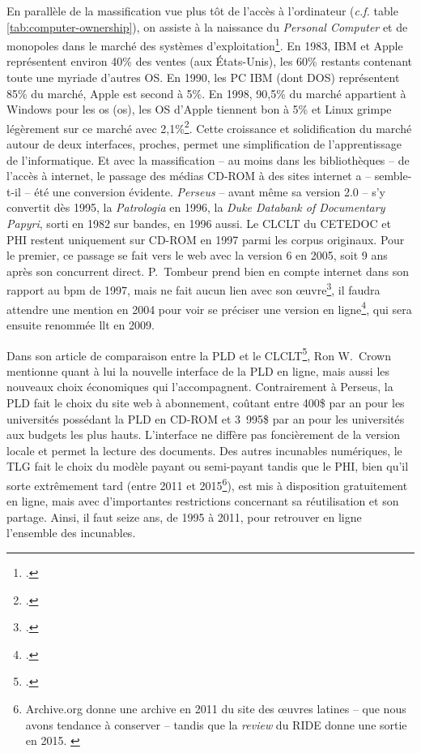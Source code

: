 En parallèle de la massification vue plus tôt de l'accès à l'ordinateur (\textit{c.f.} table \ref{tab:computer-ownership}), on assiste à la naissance du \textit{Personal Computer} et de monopoles dans le marché des systèmes d'exploitation\footcite{schlender_whos_1990}. En 1983, IBM et Apple représentent environ 40\% des ventes (aux États-Unis), les 60\% restants contenant toute une myriade d'autres OS. En 1990, les PC IBM (dont DOS) représentent 85\% du marché, Apple est second à 5\%. En 1998, 90,5\% du marché appartient à Windows pour les \acrfull{os} (\acrshort{os}), les OS d'Apple tiennent bon à 5\% et Linux grimpe légèrement sur ce marché avec 2,1\%\footcite{miles_windows_1999, reimer_total_2005}. Cette croissance et solidification du marché autour de deux interfaces, proches, permet une simplification de l'apprentissage de l'informatique. Et avec la massification -- au moins dans les bibliothèques -- de l'accès à internet, le passage des médias CD-ROM à des sites internet a -- semble-t-il -- été une conversion évidente. \textit{Perseus} -- avant même sa version 2.0 -- s'y convertit dès 1995, la \textit{Patrologia} en 1996, la \textit{Duke Databank of Documentary Papyri}, sorti en 1982 sur bandes, en 1996 aussi. Le CLCLT du CETEDOC  et PHI restent uniquement sur CD-ROM en 1997 parmi les corpus originaux. Pour le premier, ce passage se fait vers le web avec la version 6 en 2005, soit 9 ans après son concurrent direct. P.~Tombeur prend bien en compte internet dans son rapport au \acrfull{bpm} de 1997, mais ne fait aucun lien avec son œuvre\footcite{tombeur_informatique_1997}, il faudra attendre une mention en 2004 pour voir se préciser une version en ligne\footcite{tombeur_augustin_2004}, qui sera ensuite renommée \acrfull{llt} en 2009.

Dans son article de comparaison entre la PLD et le CLCLT\footcite{crown_comparing_2000}, Ron W.~Crown mentionne quant à lui la nouvelle interface de la PLD en ligne, mais aussi les nouveaux choix économiques qui l'accompagnent. Contrairement à Perseus, la PLD fait le choix du site web à abonnement, coûtant entre 400\$ par an pour les universités possédant la PLD en CD-ROM et 3~995\$ par an pour les universités aux budgets les plus hauts. L'interface ne diffère pas foncièrement de la version locale et permet la lecture des documents. Des autres incunables numériques, le TLG fait le choix du modèle payant ou semi-payant tandis que le PHI, bien qu'il sorte extrêmement tard (entre 2011 et 2015\footnote{Archive.org donne une archive en 2011 du site des œuvres latines -- que nous avons tendance à conserver -- tandis que la \textit{review} du RIDE donne une sortie en 2015. \cite{daniel_kozak_classical_2018}}), est mis à disposition gratuitement en ligne, mais avec d'importantes restrictions concernant sa réutilisation et son partage. Ainsi, il faut seize ans, de 1995 à 2011, pour retrouver en ligne l'ensemble des incunables. 

